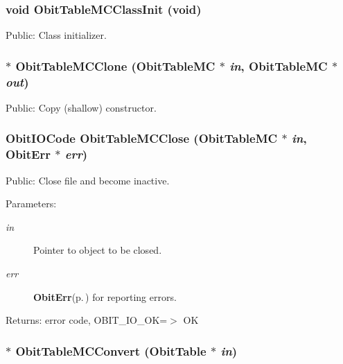 \subsubsection{\setlength{\rightskip}{0pt plus 5cm}void Obit\-Table\-MCClass\-Init (void)}\label{ObitTableMC_8h_a10}


Public: Class initializer. 

\subsubsection{$\ast$ Obit\-Table\-MCClone ({\bf Obit\-Table\-MC} $\ast$ {\em in}, {\bf Obit\-Table\-MC} $\ast$ {\em out})}\label{ObitTableMC_8h_a15}


Public: Copy (shallow) constructor. 

\subsubsection{\setlength{\rightskip}{0pt plus 5cm}Obit\-IOCode Obit\-Table\-MCClose ({\bf Obit\-Table\-MC} $\ast$ {\em in}, {\bf Obit\-Err} $\ast$ {\em err})}\label{ObitTableMC_8h_a21}


Public: Close file and become inactive. 

\begin{Desc}
\item[Parameters:]
\begin{description}
\item[{\em in}]Pointer to object to be closed. \item[{\em err}]{\bf Obit\-Err}{\rm (p.\,\pageref{structObitErr})} for reporting errors. \end{description}
\end{Desc}
\begin{Desc}
\item[Returns:]error code, OBIT\_\-IO\_\-OK=$>$ OK \end{Desc}
\subsubsection{$\ast$ Obit\-Table\-MCConvert ({\bf Obit\-Table} $\ast$ {\em in})}\label{ObitTableMC_8h_a16}


